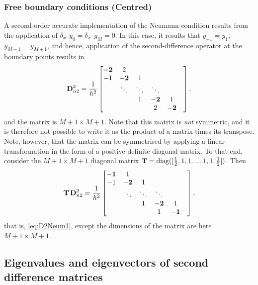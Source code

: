 \documentclass[11pt,twoside,a4paper,english]{book}
\newcommand{\dsd}{\delta_{x\cdot}}
\begin{document}
\subsubsection{Free boundary conditions (Centred)}

A second-order accurate implementation of the Neumann condition results from the application of $\dsd y_0=\dsd y_M=0$. In this case, it results that $y_{-1}=y_1$, $y_{M-1}=y_{M+1}$, and hence, application of the second-difference operator at the boundary points results in
\begin{equation}\label{eq:D2Neum2}
{\bf D}^2_{n2} = \frac{1}{h^2}\begin{bmatrix}
{\bf -2}& 2&   &  &  &  \\ 
-1& {\bf -2} & 1 &  &  &\\
& \ddots & \ddots & \ddots &  &      \\
& &  1 & {\bf -2}& 1   \\
& &   & 2 & {\bf -2}   \\
\end{bmatrix},
\end{equation}
and the matrix is $M+1 \times M+1$. Note that this matrix is \emph{not} symmetric, and it is therefore not possible to write it as the product of a matrix times its transpose. Note, however, that the matrix can be symmetrised by applying a linear transformation in the form of a positive-definite diagonal matrix. To that end, consider the $M+1\times M+1$ diagonal matrix ${\bf T} = \text{diag}([\frac{1}{2},1,1,...,1,1,\frac{1}{2}])$. Then
\begin{equation}\label{eq:LinTransfn2}
{\bf T}\,{\bf D}^{2}_{n2} = \frac{1}{h^2}\begin{bmatrix}
{\bf -1}& 1&   &  &  &  \\ 
-1& {\bf -2} & 1 &  &  &\\
& \ddots & \ddots & \ddots &  &      \\
& &  1 & {\bf -2}& 1   \\
& &   & 1 & {\bf -1}   \\
\end{bmatrix},
\end{equation}
that is, \eqref{eq:D2Neum1}, except the dimensions of the matrix are here $M+1 \times M+1$.



\subsection{Eigenvalues and eigenvectors of second difference matrices}
\end{document}
